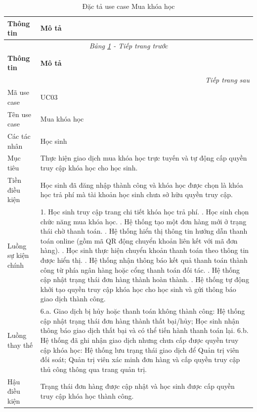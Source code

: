 ﻿\documentclass[../DoAn.tex]{subfiles}
\begin{document}
\begingroup
\small
\renewcommand{\arraystretch}{1.15}
\setlength{\LTpre}{0pt}
\setlength{\LTpost}{0pt}
\begin{longtable}{|p{3.5cm}|p{10.5cm}|}
\caption{Đặc tả use case Mua khóa học}
\label{table:uc03_mua_khoa_hoc} \\
\hline
\textbf{Thông tin} & \textbf{Mô tả} \\ \hline
\endfirsthead

\hline
\multicolumn{2}{|c|}{\textit{Bảng \ref{table:uc03_mua_khoa_hoc} - Tiếp trang trước}} \\ \hline
\textbf{Thông tin} & \textbf{Mô tả} \\ \hline
\endhead

\hline
\multicolumn{2}{|r|}{\textit{Tiếp trang sau}} \\ \hline
\endfoot

\hline
\endlastfoot

Mã use case & UC03 \\ \hline
Tên use case & Mua khóa học \\ \hline
Các tác nhân & Học sinh \\ \hline
Mục tiêu & Thực hiện giao dịch mua khóa học trực tuyến và tự động cấp quyền truy cập khóa học cho học sinh. \\ \hline
Tiền điều kiện & Học sinh đã đăng nhập thành công và khóa học được chọn là khóa học trả phí mà tài khoản học sinh chưa sở hữu quyền truy cập. \\ \hline
Luồng sự kiện chính & 
1. Học sinh truy cập trang chi tiết khóa học trả phí. \newline
2. Học sinh chọn chức năng mua khóa học. \newline
3. Hệ thống tạo một đơn hàng mới ở trạng thái chờ thanh toán. \newline
4. Hệ thống hiển thị thông tin hướng dẫn thanh toán online (gồm mã QR động chuyển khoản liên kết với mã đơn hàng). \newline
5. Học sinh thực hiện chuyển khoản thanh toán theo thông tin được hiển thị. \newline
6. Hệ thống nhận thông báo kết quả thanh toán thành công từ phía ngân hàng hoặc cổng thanh toán đối tác. \newline
7. Hệ thống cập nhật trạng thái đơn hàng thành hoàn thành. \newline
8. Hệ thống tự động khởi tạo quyền truy cập khóa học cho học sinh và gửi thông báo giao dịch thành công. \\ \hline
Luồng thay thế & 
6.a. Giao dịch bị hủy hoặc thanh toán không thành công: Hệ thống cập nhật trạng thái đơn hàng thành thất bại/hủy; Học sinh nhận thông báo giao dịch thất bại và có thể tiến hành thanh toán lại. \newline
6.b. Hệ thống đã ghi nhận giao dịch nhưng chưa cấp được quyền truy cập khóa học: Hệ thống lưu trạng thái giao dịch để Quản trị viên đối soát; Quản trị viên xác minh đơn hàng và cấp quyền truy cập thủ công thông qua trang quản trị. \\ \hline
Hậu điều kiện & Trạng thái đơn hàng được cập nhật và học sinh được cấp quyền truy cập khóa học thành công. \\ \hline
\end{longtable}
\endgroup
\end{document}
